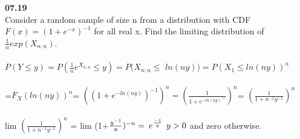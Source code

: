 

{\bf 07.19}\\
Consider a random sample of size n from a distribution with CDF \\$F(x)=(1+e^{-x})^{-1}$ for all real x. Find the limiting distribution of $\frac{1}{n}exp(X_{n:n})$.\\
\\$P(Y\leq y)=P(\frac{1}{n}e^{X_{n:n}} \leq y)=P(X_{n:n}\leq$ $ln(ny))=P(X_{1}\leq ln(ny))^n$\\
\\=$F_{X}(ln(ny))^n $= $((1+e^{-ln(ny)})^{-1})^n=(\frac{1}{1+e^{-ln(ny)^{-1}}})^n$=
$(\frac{1}{1+n^{-1}y^{-1}})^n$\\
\\lim $(\frac{1}{1+n^{-1}y^{-1}})^n$ = lim (1+$\frac{y^{-1}}{n})^{-n}\\  \\= \:e^{\frac{-1}{y}}  \: \:y>0$ and zero otherwise.



